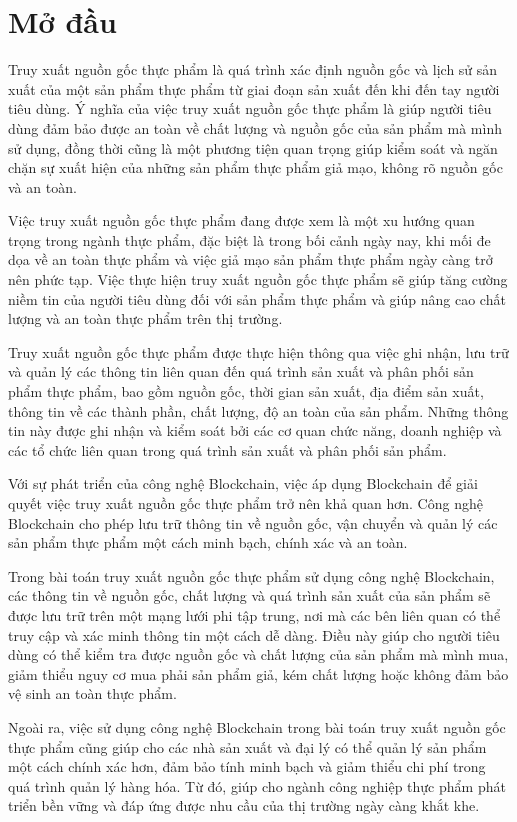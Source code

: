 \chapter*{Mở đầu}
\setcounter{page}{1}
Truy xuất nguồn gốc thực phẩm là quá trình xác định nguồn gốc và lịch sử sản xuất của một sản phẩm
thực phẩm từ giai đoạn sản xuất đến khi đến tay người tiêu dùng. Ý nghĩa của việc truy xuất nguồn 
gốc thực phẩm là giúp người tiêu dùng đảm bảo được an toàn về chất lượng và nguồn gốc của sản phẩm
mà mình sử dụng, đồng thời cũng là một phương tiện quan trọng giúp kiểm soát và ngăn chặn sự xuất
hiện của những sản phẩm thực phẩm giả mạo, không rõ nguồn gốc và an toàn.

Việc truy xuất nguồn gốc thực phẩm đang được xem là một xu hướng quan trọng trong ngành thực phẩm,
đặc biệt là trong bối cảnh ngày nay, khi mối đe dọa về an toàn thực phẩm và việc giả mạo sản phẩm 
thực phẩm ngày càng trở nên phức tạp. Việc thực hiện truy xuất nguồn gốc thực phẩm sẽ giúp tăng
cường niềm tin của người tiêu dùng đối với sản phẩm thực phẩm và giúp nâng cao chất lượng và an toàn thực phẩm trên thị trường.

Truy xuất nguồn gốc thực phẩm được thực hiện thông qua việc ghi nhận, lưu trữ và quản lý các thông
tin liên quan đến quá trình sản xuất và phân phối sản phẩm thực phẩm, bao gồm nguồn gốc, thời gian
sản xuất, địa điểm sản xuất, thông tin về các thành phần, chất lượng, độ an toàn của sản phẩm. 
Những thông tin này được ghi nhận và kiểm soát bởi các cơ quan chức năng, doanh nghiệp và các tổ 
chức liên quan trong quá trình sản xuất và phân phối sản phẩm.

Với sự phát triển của công nghệ Blockchain, việc áp dụng Blockchain để giải quyết việc truy xuất nguồn gốc 
thực phẩm trở nên khả quan hơn. Công nghệ Blockchain cho phép lưu trữ thông tin về nguồn gốc, vận chuyển và quản lý 
các sản phẩm thực phẩm một cách minh bạch, chính xác và an toàn.


Trong bài toán truy xuất nguồn gốc thực phẩm sử dụng công nghệ Blockchain, các thông tin về nguồn 
gốc, chất lượng và quá trình sản xuất của sản phẩm sẽ được lưu trữ trên một mạng lưới phi tập trung,
nơi mà các bên liên quan có thể truy cập và xác minh thông tin một cách dễ dàng. Điều này giúp cho 
người tiêu dùng có thể kiểm tra được nguồn gốc và chất lượng của sản phẩm mà mình mua, giảm thiểu 
nguy cơ mua phải sản phẩm giả, kém chất lượng hoặc không đảm bảo vệ sinh an toàn thực phẩm.

Ngoài ra, việc sử dụng công nghệ Blockchain trong bài toán truy xuất nguồn gốc thực phẩm cũng giúp
cho các nhà sản xuất và đại lý có thể quản lý sản phẩm một cách chính xác hơn, đảm bảo tính minh 
bạch và giảm thiểu chi phí trong quá trình quản lý hàng hóa. Từ đó, giúp cho ngành công nghiệp thực
phẩm phát triển bền vững và đáp ứng được nhu cầu của thị trường ngày càng khắt khe.

